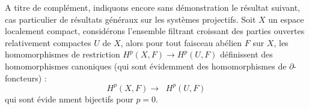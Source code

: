 A titre de complément, indiquons encore sans démonstration le résultat
suivant, cas particulier de résultats généraux sur les systèmes projectifs.
Soit $X$ un espace localement compact, considérons l'ensemble filtrant
croissant des parties ouvertes relativement compactes $U$ de $X$, alors pour
tout faisceau abélien $F$ sur $X$, les homomorphismes de restriction
$H^p(X,F)\to H^p(U,F)$ définissent des homomorphismes canoniques
(qui sont évidemment des homomorphismes de $\partial$-foncteurs) :
\[
\tag{3.10.2}
H^p(X,F)\to\mathop{\underset{\leftarrow}{\lim}} H^p(U,F)
\]
qui sont évide nment bijectifs pour $p=0$.

